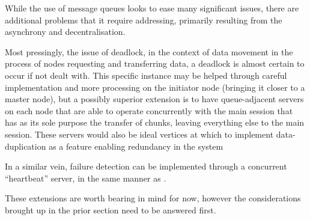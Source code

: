 While the use of message queues looks to ease many significant issues, there are additional problems that it require addressing, primarily resulting from the asynchrony and decentralisation.

Most pressingly, the issue of deadlock, in the context of data movement in the process of nodes requesting and transferring data, a deadlock is almost certain to occur if not dealt with.
This specific instance may be helped through careful implementation and more processing on the initiator node (bringing it closer to a master node), but a possibly superior extension is to have queue-adjacent servers on each node that are able to operate concurrently with the main \R{} session that has as its sole purpose the transfer of chunks, leaving everything else to the main \R{} session.
These servers would also be ideal vertices at which to implement data-duplication as a feature enabling redundancy in the system

In a similar vein, failure detection can be implemented through a concurrent ``heartbeat'' server, in the same manner as  \cite{white2012hadoop}.

These extensions are worth bearing in mind for now, however the considerations brought up in the prior section need to be answered first.
